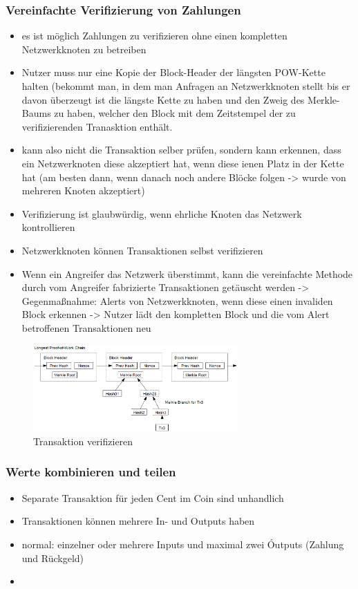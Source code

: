 \subsubsection*{Vereinfachte Verifizierung von Zahlungen}
    \begin{itemize}
        \item es ist möglich Zahlungen zu verifizieren ohne einen kompletten Netzwerkknoten zu betreiben
        \item Nutzer muss nur eine Kopie der Block-Header der längsten POW-Kette halten (bekommt man, in dem man Anfragen an Netzwerkknoten stellt bis er davon überzeugt ist die längste Kette zu haben und den Zweig des Merkle-Baums zu haben, welcher den Block mit dem Zeitstempel der zu verifizierenden Tranasktion enthält.
        \item kann also nicht die Transaktion selber prüfen, sondern kann erkennen, dass ein Netzwerknoten diese akzeptiert hat, wenn diese ienen Platz in der Kette hat (am besten dann, wenn danach noch andere Blöcke folgen -> wurde von mehreren Knoten akzeptiert)
        \item Verifizierung ist glaubwürdig, wenn ehrliche Knoten das Netzwerk kontrollieren
        \item Netzwerkknoten können Transaktionen selbst verifizieren
        \item Wenn ein Angreifer das Netzwerk überstimmt, kann die vereinfachte Methode durch vom Angreifer fabrizierte Transaktionen getäuscht werden -> Gegenmaßnahme: Alerts von Netzwerkknoten, wenn diese einen invaliden Block erkennen -> Nutzer lädt den kompletten Block und die vom Alert betroffenen Transaktionen neu
    \end{itemize}
    \begin{figure}[H]
        \centering
        \includegraphics[width=0.7\textwidth]{paperNotes/bitcoin05.PNG}
        \caption{Transaktion verifizieren}
        \label{figure:verify}
    \end{figure}
    
\subsubsection*{Werte kombinieren und teilen}
    \begin{itemize}
        \item Separate Transaktion für jeden Cent im Coin sind unhandlich
        \item Transaktionen können mehrere In- und Outputs haben
        \item normal: einzelner oder mehrere Inputs und maximal zwei Óutputs (Zahlung und Rückgeld)
        \item 
    \end{itemize}
    
